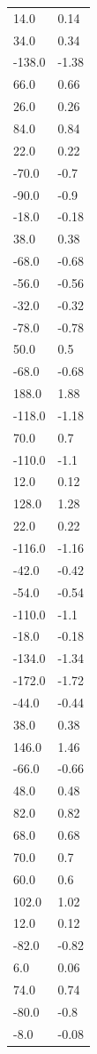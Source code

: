 \begin{longtable}{ll}
14.0 & 0.14 \\
34.0 & 0.34 \\
-138.0 & -1.38 \\
66.0 & 0.66 \\
26.0 & 0.26 \\
84.0 & 0.84 \\
22.0 & 0.22 \\
-70.0 & -0.7 \\
-90.0 & -0.9 \\
-18.0 & -0.18 \\
38.0 & 0.38 \\
-68.0 & -0.68 \\
-56.0 & -0.56 \\
-32.0 & -0.32 \\
-78.0 & -0.78 \\
50.0 & 0.5 \\
-68.0 & -0.68 \\
188.0 & 1.88 \\
-118.0 & -1.18 \\
70.0 & 0.7 \\
-110.0 & -1.1 \\
12.0 & 0.12 \\
128.0 & 1.28 \\
22.0 & 0.22 \\
-116.0 & -1.16 \\
-42.0 & -0.42 \\
-54.0 & -0.54 \\
-110.0 & -1.1 \\
-18.0 & -0.18 \\
-134.0 & -1.34 \\
-172.0 & -1.72 \\
-44.0 & -0.44 \\
38.0 & 0.38 \\
146.0 & 1.46 \\
-66.0 & -0.66 \\
48.0 & 0.48 \\
82.0 & 0.82 \\
68.0 & 0.68 \\
70.0 & 0.7 \\
60.0 & 0.6 \\
102.0 & 1.02 \\
12.0 & 0.12 \\
-82.0 & -0.82 \\
6.0 & 0.06 \\
74.0 & 0.74 \\
-80.0 & -0.8 \\
-8.0 & -0.08 \\

\end{longtable}
